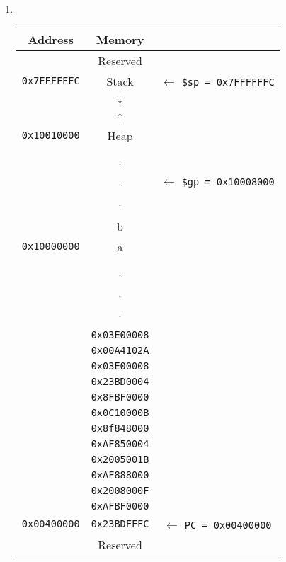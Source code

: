 \documentclass[12pt]{article}
\begin{document}
\begin{enumerate}
\newpage

\item ~
\begin{table}[h!]
\small
\setlength\tabcolsep{2pt}
\centering
\begin{tabular}{c|c|c}
Address & Memory & \\
\hline
& Reserved & \\
\hline
\texttt{0x7FFFFFFC} & Stack & $\leftarrow$ \texttt{\$sp = 0x7FFFFFFC} \\
\hline
& $\downarrow$ & \\
&&\\
& $\uparrow$ & \\
\hline
\texttt{0x10010000} & Heap & \\
\hline
&&\\
&.&\\
&.& $\leftarrow$ \texttt{\$gp = 0x10008000}\\
&.&\\
&&\\
& b &\\
\hline
\texttt{0x10000000} & a &\\
\hline
&&\\
&.&\\
&.&\\
&.&\\
&&\\
& \texttt{0x03E00008} &\\
& \texttt{0x00A4102A} &\\
& \texttt{0x03E00008} &\\
& \texttt{0x23BD0004} &\\
& \texttt{0x8FBF0000} &\\
& \texttt{0x0C10000B} &\\
& \texttt{0x8f848000} &\\
& \texttt{0xAF850004} &\\
& \texttt{0x2005001B} &\\
& \texttt{0xAF888000} &\\
& \texttt{0x2008000F} &\\
& \texttt{0xAFBF0000} &\\
\texttt{0x00400000} & \texttt{0x23BDFFFC} & $\leftarrow$ \texttt{PC = 0x00400000}\\
\hline
& Reserved & \\
\end{tabular}
\end{table}
\end{enumerate}

\newpage
\end{document}
